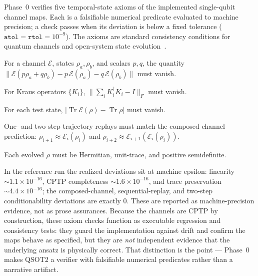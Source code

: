 Phase~0 verifies five temporal-state axioms of the implemented single-qubit channel maps.
Each is a falsifiable numerical predicate evaluated to machine precision; a check passes
when its deviation is below a fixed tolerance ($\texttt{atol}=\texttt{rtol}=10^{-9}$).
The axioms are standard consistency conditions for quantum channels and open-system
state evolution~\cite{Breuer2002}.

\begin{description}[leftmargin=1.5em]
\item[Linearity.] For a channel $\mathcal{E}$, states $\rho_a,\rho_b$, and scalars $p,q$,
  the quantity $\big\lVert \mathcal{E}(p\rho_a+q\rho_b) - p\,\mathcal{E}(\rho_a) -
  q\,\mathcal{E}(\rho_b)\big\rVert$ must vanish.
\item[CPTP completeness.] For Kraus operators $\{K_i\}$,
  $\big\lVert \sum_i K_i^\dagger K_i - I\big\rVert_F$ must vanish.
\item[Trace preservation.] For each test state,
  $\big|\operatorname{Tr}\mathcal{E}(\rho)-\operatorname{Tr}\rho\big|$ must vanish.
\item[Conditionability.] One- and two-step trajectory replays must match the composed
  channel prediction: $\rho_{i+1} \approx \mathcal{E}_i(\rho_i)$ and
  $\rho_{i+2}\approx \mathcal{E}_{i+1}(\mathcal{E}_i(\rho_i))$.
\item[Density validity.] Each evolved $\rho$ must be Hermitian, unit-trace, and positive
  semidefinite.
\end{description}

In the reference run the realized deviations sit at machine epsilon: linearity
$\sim 1.1\times10^{-16}$, CPTP completeness $\sim 1.6\times10^{-16}$, and trace
preservation $\sim 4.4\times10^{-16}$; the composed-channel, sequential-replay, and
two-step conditionability deviations are exactly $0$. These are reported as
machine-precision evidence, not as prose assurances. Because the channels are CPTP by
construction, these axiom checks function as executable regression and consistency tests:
they guard the implementation against drift and confirm the maps behave as specified, but
they are \emph{not} independent evidence that the underlying ansatz is physically correct.
That distinction is the point --- Phase~0 makes QSOT2 a verifier with falsifiable numerical
predicates rather than a narrative artifact.

